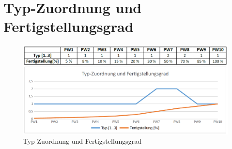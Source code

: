 \chapter{Typ-Zuordnung und Fertigstellungsgrad}

	\begin{figure}[!htb]
	  \centering
	     \includegraphics[keepaspectratio=true,scale=0.5,angle={90}]{Graphics/Typ.png}
	  \caption{Typ-Zuordnung und Fertigstellungsgrad}
	  \label{fig:Typ}
	\end{figure}